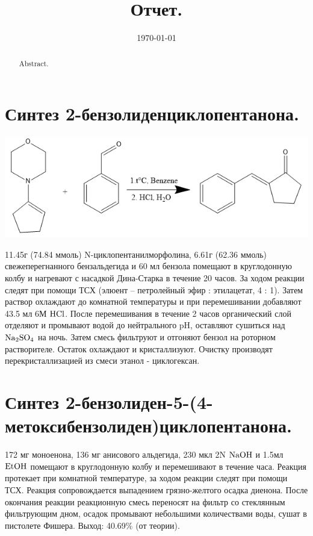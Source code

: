 \documentclass[a4paper]{article}
\title{Отчет.}
\date{\today}
\begin{document}
\maketitle

\begin{abstract}
Abstract.
\end{abstract}

\section*{Синтез 2-бензолиденциклопентанона.}
\begin{center}
\includegraphics[scale=0.5]{pictures/1.png}
\end{center}
11.45г (74.84 ммоль) N-циклопентанилморфолина, 6.61г (62.36 ммоль) свежеперегнанного бензальдегида и 60 мл бензола помещают в круглодонную колбу и нагревают с насадкой Дина-Старка в течение 20 часов. За ходом реакции следят при помощи ТСХ (элюент -- петролейный эфир : этилацетат, 4 : 1).
Затем раствор охлаждают до комнатной температуры и при перемешивании добавляют 43.5 мл 6М $\ce{HCl}$. После перемешивания в течение 2 часов органический слой отделяют и промывают водой до нейтрального pH, оставляют сушиться над $\ce{Na2SO4}$ на ночь. Затем смесь фильтруют и отгоняют бензол на роторном растворителе. Остаток охлаждают и кристаллизуют. Очистку производят перекристаллизацией из смеси этанол - циклогексан.

\section*{Синтез 2-бензолиден-5-(4-метоксибензолиден)циклопентанона.}
172 мг  моноенона, 136 мг анисового альдегида, 230 мкл 2N $\ce{NaOH}$ и 1.5мл $\ce{EtOH}$ помещают в круглодонную колбу и перемешивают в течение часа. Реакция протекает при комнатной температуре, за ходом реакции следят при помощи ТСХ. Реакция сопровождается выпадением грязно-желтого осадка диенона. После окончания реакции реакционную смесь переносят на фильтр со стеклянным фильтрующим дном, осадок промывают небольшими количествами воды, сушат в пистолете Фишера. 
Выход: 40.69$\%$ (от теории).
\end{document}
